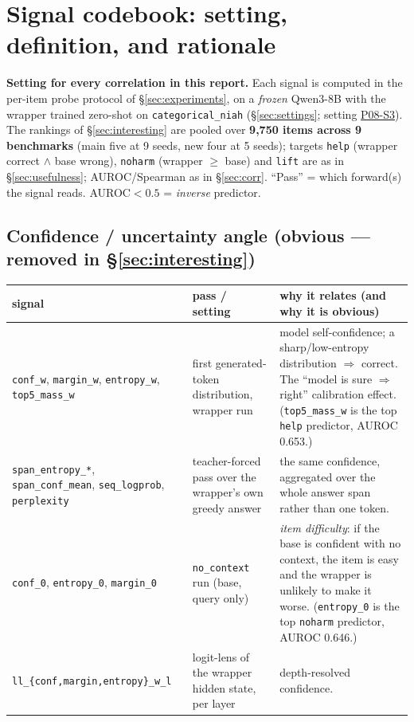 \documentclass[11pt]{article}
\newcommand{\noctx}{\texttt{no\_context}}
\newcommand{\code}[1]{\texttt{#1}}
\begin{document}
\section{Signal codebook: setting, definition, and rationale}
\label{sec:codebook}
\textbf{Setting for every correlation in this report.} Each signal is
computed in the per-item probe protocol of \S\ref{sec:experiments}, on a
\emph{frozen} Qwen3-8B with the wrapper trained zero-shot on
\code{categorical\_niah} (\S\ref{sec:settings}; setting
\href{https://github.com/BDeMo/research-notes/blob/main/notes/plans/08-model-outputs-delta-w/settings.md#p08-s3--v15-intrinsic-signal-probe}{P08-S3}).
The rankings of
\S\ref{sec:interesting} are pooled over \textbf{9{,}750 items across 9
benchmarks} (main five at 9 seeds, new four at 5 seeds); targets
\code{help} (wrapper correct $\wedge$ base wrong), \code{noharm}
(wrapper $\ge$ base) and \code{lift} are as in \S\ref{sec:usefulness};
AUROC/Spearman as in \S\ref{sec:corr}. ``Pass'' = which forward(s) the
signal reads. AUROC${<}0.5$ = \emph{inverse} predictor.

\subsection{Confidence / uncertainty angle (obvious --- removed in \S\ref{sec:interesting})}
\begin{center}\footnotesize\begin{tabular}{p{3.0cm} p{3.9cm} p{6.0cm}}
\toprule signal & pass / setting & why it relates (and why it is obvious)\\ \midrule
\code{conf\_w}, \code{margin\_w}, \code{entropy\_w}, \code{top5\_mass\_w} & first generated-token distribution, wrapper run & model self-confidence; a sharp/low-entropy distribution $\Rightarrow$ correct. The ``model is sure $\Rightarrow$ right'' calibration effect. (\code{top5\_mass\_w} is the top \code{help} predictor, AUROC 0.653.)\\
\code{span\_entropy\_*}, \code{span\_conf\_mean}, \code{seq\_logprob}, \code{perplexity} & teacher-forced pass over the wrapper's own greedy answer & the same confidence, aggregated over the whole answer span rather than one token.\\
\code{conf\_0}, \code{entropy\_0}, \code{margin\_0} & \noctx{} run (base, query only) & \emph{item difficulty}: if the base is confident with no context, the item is easy and the wrapper is unlikely to make it worse. (\code{entropy\_0} is the top \code{noharm} predictor, AUROC 0.646.)\\
\code{ll\_\{conf,margin,entropy\}\_w\_l} & logit-lens of the wrapper hidden state, per layer & depth-resolved confidence.\\
\bottomrule\end{tabular}\end{center}
\end{document}
